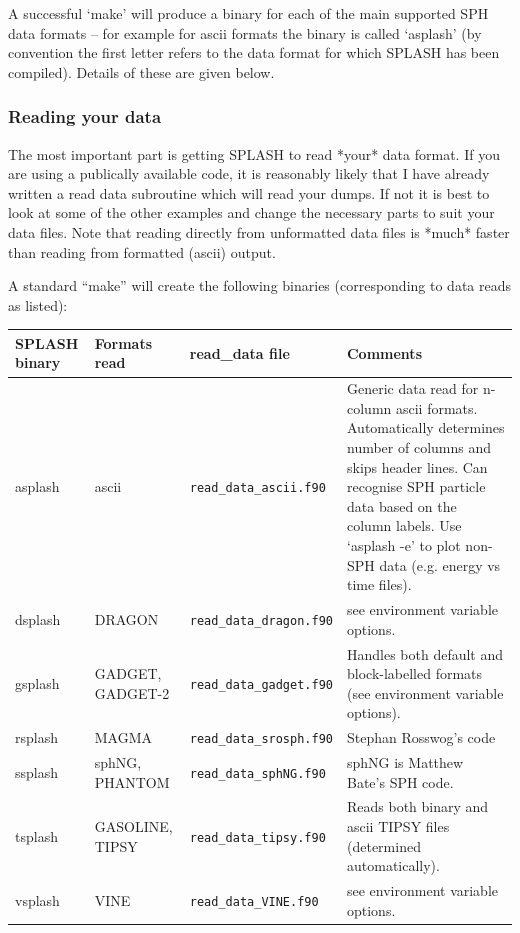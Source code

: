 \documentclass[a4paper,10pt]{article}
\newcommand{\splash}{\textsc{SPLASH }}
\begin{document}
A successful `make' will produce a binary for each of the main supported SPH data formats -- for example for ascii formats the binary is called `asplash' (by convention the first letter refers to the data format for which \splash has been compiled). Details of these are given below.

\subsubsection{ Reading your data}
 The most important part is getting \splash to read *your* data format.
If you are using a publically available code, it is reasonably likely that I
have already written a read data subroutine which will read your dumps.
If not it is best to look at some of the other examples and change the 
necessary parts to suit your data files. Note that reading directly from
unformatted data files is *much* faster than reading from formatted (ascii)
output.   

A standard ``make'' will create the following binaries (corresponding to data reads as listed):

\begin{table}[h!]
\begin{tabular}{lllp{}}
\splash binary & Formats read & read\_data file & Comments \\
\hline
asplash & ascii & \verb+read_data_ascii.f90+ & Generic data read for n-column ascii formats. Automatically determines number of columns and skips header lines. Can recognise SPH particle data based on the column labels. Use `asplash -e' to plot non-SPH data (e.g. energy vs time files).\\
dsplash & DRAGON & \verb+read_data_dragon.f90+ & see environment variable options. \\
gsplash & GADGET, GADGET-2 &  \verb+read_data_gadget.f90+ & Handles both default and block-labelled formats (see environment variable options). \\
rsplash & MAGMA & \verb+read_data_srosph.f90+  & Stephan Rosswog's code \\
ssplash & sphNG, PHANTOM & \verb+read_data_sphNG.f90+ & sphNG is Matthew Bate's SPH code. \\
tsplash & GASOLINE, TIPSY  &  \verb+read_data_tipsy.f90+ & Reads both binary and ascii TIPSY files (determined automatically). \\
vsplash & VINE & \verb+read_data_VINE.f90+ & see environment variable options. \\
\hline
\end{tabular} 
\end{table}
\end{document}
